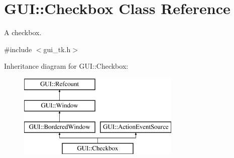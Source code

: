 \hypertarget{classGUI_1_1Checkbox}{\section{G\-U\-I\-:\-:Checkbox Class Reference}
\label{classGUI_1_1Checkbox}
}


A checkbox.  




{\ttfamily \#include $<$gui\-\_\-tk.\-h$>$}

Inheritance diagram for G\-U\-I\-:\-:Checkbox\-:\begin{figure}[H]
\begin{center}
\leavevmode
\includegraphics[height=4.000000cm]{classGUI_1_1Checkbox}
\end{center}
\end{figure}
